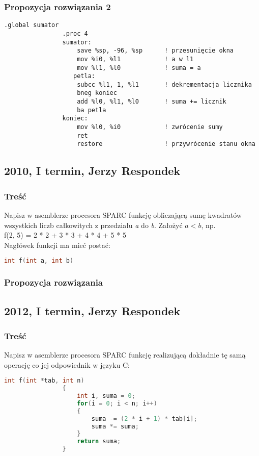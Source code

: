 		\subsubsection{Propozycja rozwiązania 2}
			\begin{lstlisting}[language={[sparc]Assembler}]
			    .global sumator
			    .proc 4
			    sumator:
				    save %sp, -96, %sp		! przesunięcie okna
				    mov %i0, %l1			! a w l1
				    mov %l1, %l0			! suma = a
				   petla:
				    subcc %l1, 1, %l1		! dekrementacja licznika
				    bneg koniec
				    add %l0, %l1, %l0		! suma += licznik
				    ba petla
			    koniec:
				    mov %l0, %i0			! zwrócenie sumy
				    ret
				    restore					! przywrócenie stanu okna
			\end{lstlisting}
			
	\newpage
	\subsection{2010, I termin, Jerzy Respondek}
		\subsubsection{Treść}
			Napisz w asemblerze procesora SPARC funkcję obliczającą sumę kwadratów wszystkich liczb całkowitych z przedziału \emph{a} do \emph{b}. Założyć $ a < b $, np.\\
			f(2, 5) = 2 * 2 + 3 * 3 + 4 * 4 + 5 * 5\\
			Nagłówek funkcji ma mieć postać:
			\begin{lstlisting}[language=C]
				int f(int a, int b)
			\end{lstlisting}
		\subsubsection{Propozycja rozwiązania}
	\newpage
	\subsection{2012, I termin, Jerzy Respondek}
		\subsubsection{Treść}
			Napisz w asemblerze procesora SPARC funkcję realizującą dokładnie tę samą operację co jej odpowiednik w języku C:
			\begin{lstlisting}[language=C]
				int f(int *tab, int n)
				{
					int i, suma = 0;
					for(i = 0; i < n; i++)
					{
						suma -= (2 * i + 1) * tab[i];
						suma *= suma;
					}
					return suma;
				}
			\end{lstlisting}
